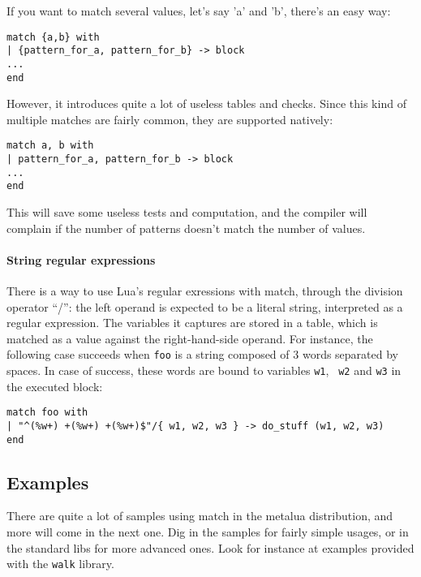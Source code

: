 If you want to match several values, let's say 'a' and 'b', there's an easy way:

\begin{verbatim}
match {a,b} with
| {pattern_for_a, pattern_for_b} -> block
...
end
\end{verbatim}

However, it introduces quite a lot of useless tables and checks. Since this kind
of multiple matches are fairly common, they are supported natively:

\begin{verbatim}
match a, b with
| pattern_for_a, pattern_for_b -> block
...
end
\end{verbatim}

This will save some useless tests and computation, and the compiler will
complain if the number of patterns doesn't match the number of values.

\paragraph{String regular expressions}
There is a way to use Lua's regular exressions with match, through the division
operator ``/'': the left operand is expected to be a literal string, interpreted
as a regular expression. The variables it captures are stored in a table, which
is matched as a value against the right-hand-side operand. For instance, the
following case succeeds when {\tt foo} is a string composed of 3 words separated
by spaces. In case of success, these words are bound to variables {\tt w1}, {\tt
  w2} and {\tt w3} in the executed block:

\begin{verbatim}
match foo with
| "^(%w+) +(%w+) +(%w+)$"/{ w1, w2, w3 } -> do_stuff (w1, w2, w3)
end
\end{verbatim}

\subsection{Examples}
There are quite a lot of samples using match in the metalua distribution, and
more will come in the next one. Dig in the samples for fairly simple usages, or
in the standard libs for more advanced ones. Look for instance at examples
provided with the {\tt walk} library.
